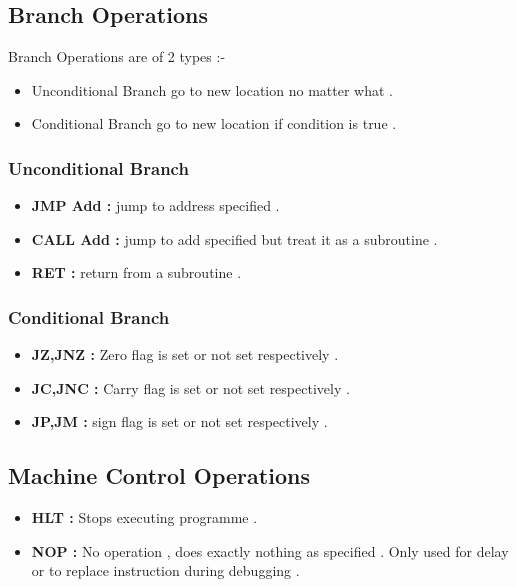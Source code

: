 \documentclass[14pt]{article}
\begin{document}
\subsection{Branch Operations}
Branch Operations are of 2 types :-
\begin{itemize}
\item{Unconditional Branch go to new location no matter what . } 
\item{Conditional Branch go to new location if condition is true . }
\end{itemize}
\subsubsection{Unconditional Branch}
\begin{itemize}
\item{\textbf{JMP Add :}} jump to address specified .
\item{\textbf{CALL Add :}} jump to add specified but treat it as a subroutine .
\item{\textbf{RET :}} return from a subroutine .
\end{itemize}
\subsubsection{Conditional Branch}
\begin{itemize}
\item{\textbf{JZ,JNZ :}} Zero flag is set or not set respectively .
\item{\textbf{JC,JNC :}} Carry flag is set or not set respectively .
\item{\textbf{JP,JM :}} sign flag is set or not set respectively .
\end{itemize}

\subsection{Machine Control Operations}
\begin{itemize}
	\item{\textbf{HLT :}} Stops executing programme .
	\item{\textbf{NOP :}} No operation , does exactly nothing as specified . Only used for delay or to replace instruction during debugging .
\end{itemize}



\end{document}
